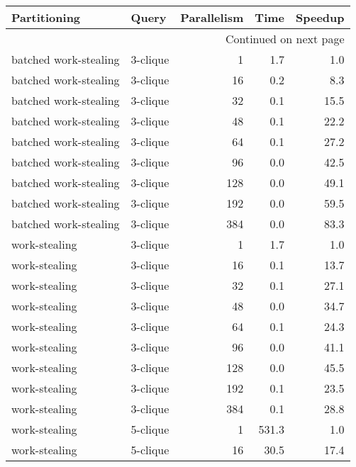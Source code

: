 \begin{longtable}{llr|rr}
\toprule
          Partitioning &     Query &  Parallelism &   Time &  Speedup \\
\midrule
\endhead
\midrule
\multicolumn{5}{r}{{Continued on next page}} \\
\midrule
\endfoot

\bottomrule
\endlastfoot
 batched work-stealing &  3-clique &            1 &    1.7 &      1.0 \\
 batched work-stealing &  3-clique &           16 &    0.2 &      8.3 \\
 batched work-stealing &  3-clique &           32 &    0.1 &     15.5 \\
 batched work-stealing &  3-clique &           48 &    0.1 &     22.2 \\
 batched work-stealing &  3-clique &           64 &    0.1 &     27.2 \\
 batched work-stealing &  3-clique &           96 &    0.0 &     42.5 \\
 batched work-stealing &  3-clique &          128 &    0.0 &     49.1 \\
 batched work-stealing &  3-clique &          192 &    0.0 &     59.5 \\
 batched work-stealing &  3-clique &          384 &    0.0 &     83.3 \\
         work-stealing &  3-clique &            1 &    1.7 &      1.0 \\
         work-stealing &  3-clique &           16 &    0.1 &     13.7 \\
         work-stealing &  3-clique &           32 &    0.1 &     27.1 \\
         work-stealing &  3-clique &           48 &    0.0 &     34.7 \\
         work-stealing &  3-clique &           64 &    0.1 &     24.3 \\
         work-stealing &  3-clique &           96 &    0.0 &     41.1 \\
         work-stealing &  3-clique &          128 &    0.0 &     45.5 \\
         work-stealing &  3-clique &          192 &    0.1 &     23.5 \\
         work-stealing &  3-clique &          384 &    0.1 &     28.8 \\
         work-stealing &  5-clique &            1 &  531.3 &      1.0 \\
         work-stealing &  5-clique &           16 &   30.5 &     17.4 \\

\end{longtable}
